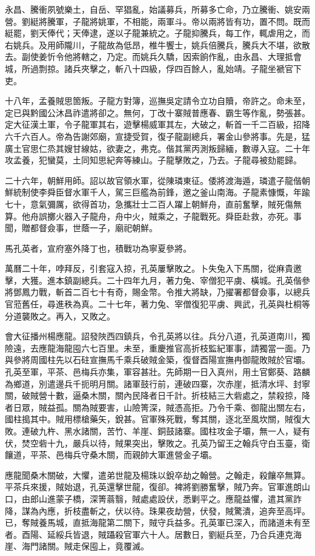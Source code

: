 \begin{pinyinscope}
永昌、騰衝夙號樂土，自岳、罕猖亂，始議募兵，所募多亡命，乃立騰衝、姚安兩營。劉綎將騰軍，子龍將姚軍，不相能，兩軍斗。帝以兩將皆有功，置不問。既而綎罷，劉天俸代；天俸逮，遂以子龍兼統之。子龍抑騰兵，每工作，輒虐用之，而右姚兵。及用師隴川，子龍故為低昂，椎牛饗士，姚兵倍騰兵，騰兵大不堪，欲散去。副使姜忻令他將轄之，乃定。而姚兵久驕，因索餉作亂，由永昌、大理抵會城，所過剽掠。諸兵夾擊之，斬八十四級，俘四百餘人，亂始靖。子龍坐褫官下吏。

十八年，孟養賊思箇叛。子龍方對簿，巡撫吳定請令立功自贖，帝許之。命未至，定已與黔國公沐昌祚遣將卻之。無何，丁改十寨賊普應春、霸生等作亂，勢張甚。定大征漢土軍，令子龍軍其右，遊擊楊威軍其左，大破之，斬首一千二百級，招降六千六百人。帝為告謝郊廟，宣捷受賀，復子龍副總兵，署金山參將事。先是，猛廣土官思仁烝其嫂甘線姑，欲妻之，弗克。偕其黨丙測叛歸緬，數導入寇。二十年攻孟養，犯蠻莫，土同知思紀奔等練山。子龍擊敗之，乃去。子龍尋被劾罷歸。

二十六年，朝鮮用師。詔以故官領水軍，從陳璘東征。倭將渡海遁，璘遣子龍偕朝鮮統制使李舜臣督水軍千人，駕三巨艦為前鋒，邀之釜山南海。子龍素慷慨，年踰七十，意氣彌厲，欲得首功，急攜壯士二百人躍上朝鮮舟，直前奮擊，賊死傷無算。他舟誤擲火器入子龍舟，舟中火，賊乘之，子龍戰死。舜臣赴救，亦死。事聞，贈都督僉事，世蔭一子，廟祀朝鮮。

馬孔英者，宣府塞外降丁也，積戰功為寧夏參將。

萬曆二十年，哱拜反，引套寇入掠，孔英屢擊敗之。卜失兔入下馬關，從麻貴邀擊，大獲。進本鎮副總兵。二十四年九月，著力兔、宰僧犯平虜、橫城。孔英偕參將鄧鳳力戰，斬首二百七十有奇，賜金幣。令推大將缺，乃擢署都督僉事，以總兵官蒞舊任，尋進秩為真。二十七年，著力兔、宰僧復犯平虜、興武，孔英與杜桐等分道襲敗之。再入，又敗之。

會大征播州楊應龍。詔發陜西四鎮兵，令孔英將以往。兵分八道，孔英道南川，獨險遠，去應龍海龍囤六七百里。未至，重慶推官高折枝監紀軍事，請獨當一面。乃與參將周國柱先以石砫宣撫馬千乘兵破賊金築，復督酉陽宣撫冉御龍敗賊於官壩。孔英至軍，平茶、邑梅兵亦集，軍容甚壯。先師期一日入真州，用土官鄭葵、路麟為鄉道，別遣邊兵千扼明月關。諸軍鼓行前，連破四寨，次赤崖，抵清水坪、封寧關，破賊營十數，逼桑木關，關內民降者日千計。折枝結三大砦處之，禁殺掠，降者日眾，賊益孤。關為賊要害，山險箐深，賊憑高拒。乃令千乘、御龍出關左右，國柱搗其中。賊用標槍藥矢，銳甚。官軍殊死戰，奪其關，逐北至風坎關，賊復大敗。連破九杵、黑水諸關，苦竹、羊崖、銅鼓諸寨。國柱攻金子壩，無一人，疑有伏，焚空砦十九，嚴兵以待，賊果突出，擊敗之。孔英乃留王之翰兵守白玉臺，衛饟道，平茶、邑梅兵守桑木關，而親帥大軍進營金子壩。

應龍聞桑木關破，大懼，遣弟世龍及楊珠以銳卒劫之翰營。之翰走，殺饟卒無算。平茶兵來援，賊始退，孔英還擊世龍，復卻。裨將劉勝奮擊，賊乃奔。官軍進朗山口，由郎山進蒙子橋，深箐蓊翳，賊處處設伏，悉剿平之。應龍益懼，遣其黨詐降，謀為內應，折枝盡斬之，伏以待。珠果夜劫營，伏發，賊驚潰，追奔至高坪。已，奪賊養馬城，直抵海龍第二關下，賊守兵益多。孔英軍已深入，而諸道未有至者。酉陽、延綏兵皆退，賊躡殺官軍六十人。居數日，劉綎兵至，乃合兵連克海崖、海門諸關。賊走保囤上，竟覆滅。


\end{pinyinscope}
